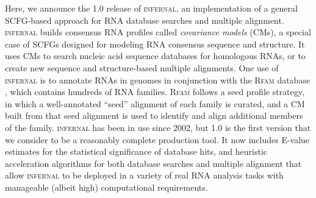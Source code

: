 Here, we announce the 1.0 release of \textsc{infernal}, an
implementation of a general SCFG-based approach for RNA database
searches and multiple alignment. \textsc{infernal} builds consensus
RNA profiles called \emph{covariance models} (CMs), a special case of
SCFGs designed for modeling RNA consensus sequence and structure. It
uses CMs to search nucleic acid sequence databases for homologous
RNAs, or to create new sequence and structure-based multiple %
alignments. One use of \textsc{infernal} is to annotate RNAs in
genomes in conjunction with the \textsc{Rfam} database
\citep{Gardner09}, which contains hundreds of RNA families.
\textsc{Rfam} follows a seed profile strategy, in which a
well-annotated ``seed'' alignment of each family is curated, and a CM
built from that seed alignment is used to identify and align
additional members of the family.  \textsc{infernal} has been in use
since 2002, but 1.0 is the first version that we consider to be a
reasonably complete production tool. It now includes E-value estimates
for the statistical significance of database hits, and heuristic
acceleration algorithms for both database searches and multiple
alignment that allow \textsc{infernal} to be deployed in a variety of
real RNA analysis tasks with manageable (albeit high) computational
requirements.

